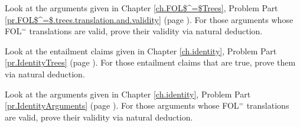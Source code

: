 \problempart
\label{pr.FOL$^=$ND.trees1}
Look at the arguments given in Chapter \ref{ch.FOL$^=$Trees}, Problem Part \ref{pr.FOL$^=$.trees.translation.and.validity} (page \pageref{pr.FOL$^=$.trees.translation.and.validity}). For those arguments whose FOL$^=$ translations are valid, prove their validity via natural deduction.

\problempart
\label{pr.FOL$^=$ND.trees2}
Look at the entailment claims given in Chapter \ref{ch.identity}, Problem Part \ref{pr.IdentityTrees} (page \pageref{pr.IdentityTrees}). For those entailment claims that are true, prove them via natural deduction.

\problempart
\label{pr.FOL$^=$ND.trees3}
Look at the arguments given in Chapter \ref{ch.identity}, Problem Part \ref{pr.IdentityArguments} (page \pageref{pr.IdentityArguments}). For those arguments whose FOL$^=$ translations are valid, prove their validity via natural deduction.

\fi

